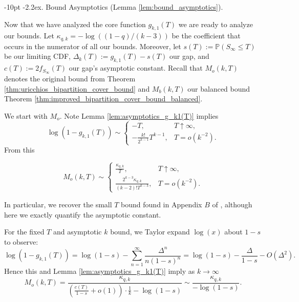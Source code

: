 \documentclass[10pt,oneside,reqno]{article}
\makeatletter
\theoremstyle{plain}
\theoremstyle{definition}
\numberwithin{equation}{section}
\def\subsubsection#1{\@startsection{subsubsection}{3}{0pt}%
{\medskipamount}%
{-10pt}%
{\normalsize\itshape}{\kern-2.2ex. #1.}}
\renewcommand{\cite}{\citep}
\renewcommand{\leq}{\leqslant}
\renewcommand{\P}{\mathbb{P}}
\makeatother
\begin{document}
\subsubsection{Bound Asymptotics (Lemma \ref{lem:bound_asymptotics})}
\label{app:bound-asymptotics}

Now that we have analyzed the core function $g_{k,1}(T)$ we are ready to analyze our bounds. Let $\kappa_{q,k} = -\log\left((1-q)/(k-3)\right)$ be the coefficient that occurs in the numerator of all our bounds. Moreover, let $s(T) := \P(S_\infty \leq T)$ be our limiting CDF, $\Delta_k(T) := g_{k,1}(T) - s(T)$ our gap, and $c(T) := 2f_{S_\infty}(T)$ our gap's asymptotic constant. Recall that $M_o(k, T)$ denotes the original bound from Theorem \ref{thm:uricchios_bipartition_cover_bound} and $M_b(k,T)$ our balanced bound Theorem \ref{thm:improved_bipartition_cover_bound_balanced}.

 We start with $M_o$. Note Lemma \ref{lem:asymptotics_g_k1(T)} implies
%
\begin{equation}
    \log(1-g_{k,1}(T)) \sim \begin{cases} - T, & T \uparrow \infty, \\ 
 -\frac{k!}{2^{k-1}} T^{k-1}, &  T = o(k^{-2}).
\end{cases}
\label{eqn:asymptotics_T_mapsto_log(one_minus_g_k1(T))}
\end{equation}
%
\noindent From this

\[M_{o}(k,T) \sim \begin{cases}
    \frac{\kappa_{q,k}}{T}, & T \uparrow \infty, \\
    \frac{2^{k-3}\kappa_{q,k}}{(k-2)! T^{k-3}}, & T = o(k^{-2}).
\end{cases}\]

\noindent In particular, we recover the small $T$ bound found in Appendix $B$ of \cite{shekhar2018_how_many_genes_are_enough}, although here we exactly quantify the asymptotic constant.

  For the fixed $T$ and asymptotic $k$ bound, we Taylor expand $\log(x)$ about $1 - s$ to observe:\\
%
\[\log(1 - g_{k,1}(T) )= \log(1-s)-\sum_{n=1}^\infty \frac{\Delta^n}{n(1-s)^n} = \log(1-s) - \frac{\Delta}{1-s} - O(\Delta^2).\]
%
\noindent Hence this and Lemma \ref{lem:asymptotics_g_k1(T)} imply as $k \to \infty$
%
\[M_o(k,T) = \frac{\kappa_{q,k}}{\left(\frac{c(T)}{1-s} + o(1)\right) \cdot \frac{1}{k} - \log(1-s)} \sim \frac{\kappa_{q,k}}{-\log(1-s)}.\]
\end{document}
